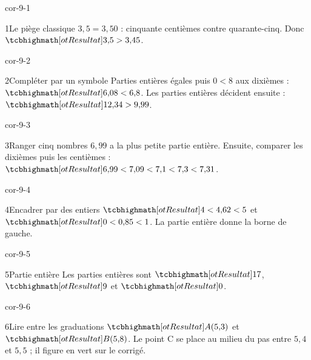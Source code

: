 \clearpage\pagestyle{otMain}\setlength{\otBlocEspacement}{2.5mm}\fontsize{11}{15}\selectfont{}
\begin{blocLivre}{cor-9-1}\begin{corrige}{1}{Le piège classique}
$3{,}5=3{,}50$ : cinquante centièmes contre quarante-cinq. Donc $\res{3{,}5>3{,}45}$.
\end{corrige}\end{blocLivre}
\begin{blocLivre}{cor-9-2}\begin{corrige}{2}{Compléter par un symbole}
Parties entières égales puis $0<8$ aux dixièmes : $\res{6{,}08<6{,}8}$. Les parties entières décident ensuite : $\res{12{,}34>9{,}99}$.
\end{corrige}\end{blocLivre}
\begin{blocLivre}{cor-9-3}\begin{corrige}{3}{Ranger cinq nombres}
$6{,}99$ a la plus petite partie entière. Ensuite, comparer les dixièmes puis les centièmes : $\res{6{,}99<7{,}09<7{,}1<7{,}3<7{,}31}$.
\end{corrige}\end{blocLivre}
\begin{blocLivre}{cor-9-4}\begin{corrige}{4}{Encadrer par des entiers}
$\res{4<4{,}62<5}$ et $\res{0<0{,}85<1}$. La partie entière donne la borne de gauche.
\end{corrige}\end{blocLivre}
\begin{blocLivre}{cor-9-5}\begin{corrige}{5}{Partie entière}
Les parties entières sont $\res{17}$, $\res9$ et $\res0$.
\end{corrige}\end{blocLivre}
\begin{blocLivre}{cor-9-6}\begin{corrige}{6}{Lire entre les graduations}
$\res{A(5{,}3)}$ et $\res{B(5{,}8)}$. Le point C se place au milieu du pas entre $5{,}4$ et $5{,}5$ ; il figure en vert sur le corrigé.
\label{fig-cor-9-6}
\end{corrige}\end{blocLivre}
